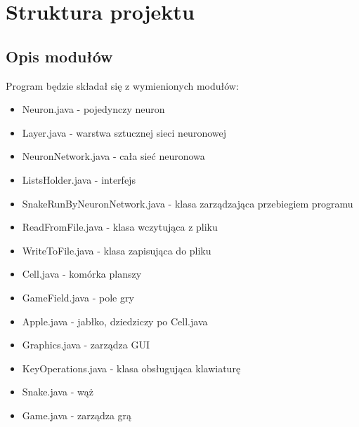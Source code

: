 \documentclass[12pt]{article}
\begin{document}
	\section {Struktura projektu}
		\subsection {Opis modułów}
			Program będzie składał się z wymienionych modułów:
			\begin{itemize}
				\item Neuron.java - pojedynczy neuron
				\item Layer.java - warstwa sztucznej sieci neuronowej
				\item NeuronNetwork.java - cała sieć neuronowa
				\item ListsHolder.java - interfejs
				\item SnakeRunByNeuronNetwork.java - klasa zarządzająca przebiegiem programu
				\item ReadFromFile.java - klasa wczytująca z pliku
				\item WriteToFile.java - klasa zapisująca do pliku
				\item Cell.java - komórka planszy
				\item GameField.java - pole gry
				\item Apple.java - jabłko, dziedziczy po Cell.java
				\item Graphics.java - zarządza GUI
				\item KeyOperations.java - klasa obsługująca klawiaturę
				\item Snake.java - wąż
				\item Game.java - zarządza grą			
			\end{itemize}
\end{document}
